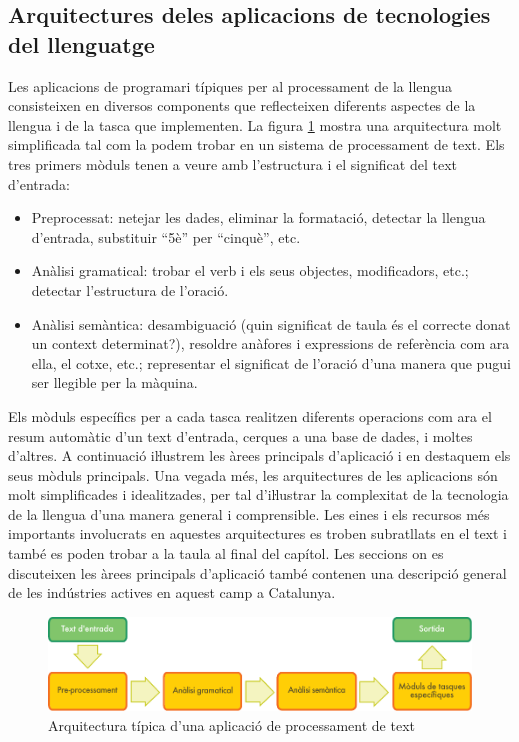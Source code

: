 \begin{multicols}{2}
\subsection[Arquitectures de les aplicacions de tecnologies del llenguatge]{Arquitectures de\newline les aplicacions de tecnologies del llenguatge}

Les aplicacions de programari típiques per al processament de la llengua consisteixen en diversos components que reflecteixen diferents aspectes de la llengua i de la tasca que implementen. La figura \ref{fig:textprocessingarch_ca} mostra una arquitectura molt simplificada tal com la podem trobar en un sistema de processament de text. Els tres primers mòduls tenen a veure amb l’estructura i el significat del text d’entrada:
\begin{itemize}
\item Preprocessat: netejar les dades, eliminar la formatació, detectar la llengua d’entrada, substituir “5è” per “cinquè”, etc.
\item Anàlisi gramatical: trobar el verb i els seus objectes, modificadors, etc.; detectar l’estructura de l’oració.
\item Anàlisi semàntica: desambiguació (quin significat de taula és el correcte donat un context determinat?), resoldre anàfores i expressions de referència com ara ella, el cotxe, etc.; representar el significat de l’oració d’una manera que pugui ser llegible per la màquina.
\end{itemize}


Els mòduls específics per a cada tasca realitzen diferents operacions com ara el resum automàtic d’un text d’entrada, cerques a una base de dades, i moltes d’altres. A continuació iŀlustrem les àrees principals d’aplicació i en destaquem els seus mòduls principals. Una vegada més, les arquitectures de les aplicacions són molt simplificades i idealitzades, per tal d’iŀlustrar la complexitat de la tecnologia de la llengua d’una manera general i comprensible. Les eines i els recursos més importants involucrats en aquestes arquitectures es troben subratllats en el text i també es poden trobar a la taula al final del capítol. Les seccions on es discuteixen les àrees principals d’aplicació també contenen una descripció general de les indústries actives en aquest camp a Catalunya.

\begin{figure}[b]
  \center
  \vspace{-5mm} \includegraphics[width=\textwidth]{../_media/catalan/text_processing_app_architecture}
  \caption{Arquitectura típica d'una aplicació de processament de text}
  \label{fig:textprocessingarch_ca}
\end{figure}


\end{multicols}
